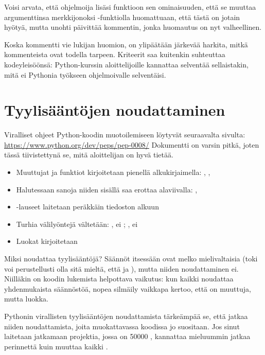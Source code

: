 Voisi arvata, että ohjelmoija lisäsi funktioon sen ominaisuuden, että se muuttaa argumenttinsa merkkijonoksi -funktiolla huomattuaan, että tästä on jotain hyötyä, mutta unohti päivittää kommentin, jonka huomautus on nyt valheellinen.

Koska kommentti vie lukijan huomion, on ylipäätään järkevää harkita, mitkä kommenteista ovat todella tarpeen. Kriteerit saa kuitenkin suhteuttaa kodeyleisöönsä: Python-kurssin aloittelijoille kannattaa selventää sellaistakin, mitä ei Pythonia työkseen ohjelmoivalle selventäisi.

\section{Tyylisääntöjen noudattaminen}

Viralliset ohjeet Python-koodin muotoilemiseen löytyvät seuraavalta sivulta: \url{https://www.python.org/dev/peps/pep-0008/} Dokumentti on varsin pitkä, joten tässä tiivistettynä se, mitä aloittelijan on hyvä tietää.

\begin{itemize}
\item Muuttujat ja funktiot kirjoitetaan pienellä alkukirjaimella: , , 
\item Halutessaan sanoja niiden sisällä saa erottaa alaviivalla: , 
\item {}-lauseet laitetaan peräkkäin tiedoston alkuun
\item Turhia välilyöntejä vältetään: , ei ; , ei 
\item Luokat kirjoitetaan 
\end{itemize}

Miksi noudattaa tyylisääntöjä? Säännöt itsessään ovat melko mielivaltaisia (toki voi perustellusti olla sitä mieltä, että  ja ), mutta niiden noudattaminen ei. Niilläkin on koodin lukemista helpottava vaikutus: kun kaikki noudattaa yhdenmukaista säännöstöä, nopea silmäily vaikkapa kertoo, että  on muuttuja, mutta  luokka.

Pythonin virallisten tyylisääntöjen noudattamista tärkeämpää se, että jatkaa niiden noudattamista, joita muokattavassa koodissa jo suositaan. Jos sinut laitetaan jatkamaan projektia, jossa on 50000 , kannattaa mieluummin jatkaa perinnettä kuin muuttaa kaikki .
